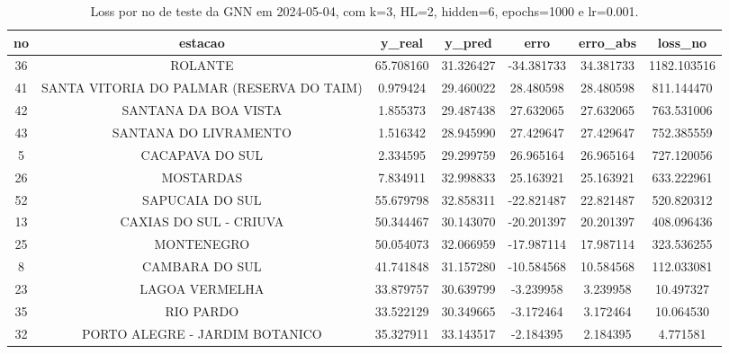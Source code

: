 \begin{table}[h]
\centering
\caption{Loss por no de teste da GNN em 2024-05-04, com k=3, HL=2, hidden=6, epochs=1000 e lr=0.001.}
\label{tab:gnn_loss_k3_hl2_h6_e1000_d20240504}
\begin{tabular}{ccccccc}
\toprule
no & estacao & y\_real & y\_pred & erro & erro\_abs & loss\_no \\
\midrule
36 & ROLANTE & 65.708160 & 31.326427 & -34.381733 & 34.381733 & 1182.103516 \\
41 & SANTA VITORIA DO PALMAR (RESERVA DO TAIM) & 0.979424 & 29.460022 & 28.480598 & 28.480598 & 811.144470 \\
42 & SANTANA DA BOA VISTA & 1.855373 & 29.487438 & 27.632065 & 27.632065 & 763.531006 \\
43 & SANTANA DO LIVRAMENTO & 1.516342 & 28.945990 & 27.429647 & 27.429647 & 752.385559 \\
5 & CACAPAVA DO SUL & 2.334595 & 29.299759 & 26.965164 & 26.965164 & 727.120056 \\
26 & MOSTARDAS & 7.834911 & 32.998833 & 25.163921 & 25.163921 & 633.222961 \\
52 & SAPUCAIA DO SUL & 55.679798 & 32.858311 & -22.821487 & 22.821487 & 520.820312 \\
13 & CAXIAS DO SUL - CRIUVA & 50.344467 & 30.143070 & -20.201397 & 20.201397 & 408.096436 \\
25 & MONTENEGRO & 50.054073 & 32.066959 & -17.987114 & 17.987114 & 323.536255 \\
8 & CAMBARA DO SUL & 41.741848 & 31.157280 & -10.584568 & 10.584568 & 112.033081 \\
23 & LAGOA VERMELHA & 33.879757 & 30.639799 & -3.239958 & 3.239958 & 10.497327 \\
35 & RIO PARDO & 33.522129 & 30.349665 & -3.172464 & 3.172464 & 10.064530 \\
32 & PORTO ALEGRE - JARDIM BOTANICO & 35.327911 & 33.143517 & -2.184395 & 2.184395 & 4.771581 \\
\bottomrule
\end{tabular}
\end{table}
